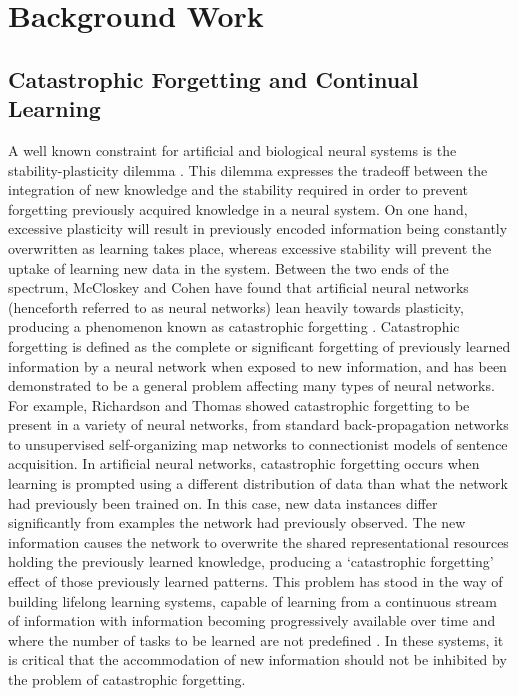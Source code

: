 \documentclass{article}
\begin{document}
\section{Background Work} \label{background}

\subsection{Catastrophic Forgetting and Continual Learning} \label{catastrophic_forgetting_and_CL}
A well known constraint for artificial and biological neural systems is the stability-plasticity dilemma \cite{mermillod2013stability}. This dilemma expresses the tradeoff between the integration of new knowledge and the stability required in order to prevent forgetting previously acquired knowledge in a neural system. On one hand, excessive plasticity will result in previously encoded information being constantly overwritten as learning takes place, whereas excessive stability will prevent the uptake of learning new data in the system. Between the two ends of the spectrum, McCloskey and Cohen \cite{mccloskey1989psychology} have found that artificial neural networks (henceforth referred to as neural networks) lean heavily towards plasticity, producing a phenomenon known as catastrophic forgetting \cite{mccloskey1989psychology}. Catastrophic forgetting is defined as the complete or significant forgetting of previously learned information by a neural network when exposed to new information, and has been demonstrated to be a general problem affecting many types of neural networks. For example, Richardson and Thomas \cite{richardson2008critical} showed catastrophic forgetting to be present in a variety of neural networks, from standard back-propagation networks to unsupervised self-organizing map networks to connectionist models of sentence acquisition. In artificial neural networks, catastrophic forgetting occurs when learning is prompted using a different distribution of data than what the network had previously been trained on. In this case, new data instances differ significantly from examples the network had previously observed. The new information causes the network to overwrite the shared representational resources holding the previously learned knowledge, producing a ‘catastrophic forgetting’ effect of those previously learned patterns. This problem has stood in the way of building lifelong learning systems, capable of learning from a continuous stream of information with information becoming progressively available over time and where the number of tasks to be learned are not predefined \cite{parisi2019continual}. In these systems, it is critical that the accommodation of new information should not be inhibited by the problem of catastrophic forgetting. 
\end{document}
